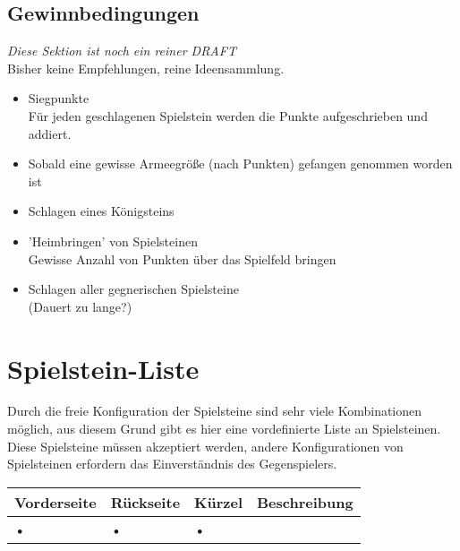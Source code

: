 \documentclass{article}
\begin{document}
\subsection{Gewinnbedingungen}

	\textit{Diese Sektion ist noch ein reiner DRAFT} \\
	Bisher keine Empfehlungen, reine Ideensammlung.
	
	\begin{itemize}
	\item Siegpunkte \\
		  Für jeden geschlagenen Spielstein werden die Punkte aufgeschrieben und addiert.

	
	\item Sobald eine gewisse Armeegröße (nach Punkten) gefangen genommen worden ist
	
	\item Schlagen eines Königsteins
	
	\item 'Heimbringen' von Spielsteinen \\
	       Gewisse Anzahl von Punkten über das Spielfeld bringen
	
	\item Schlagen aller gegnerischen Spielsteine \\
	      (Dauert zu lange?)	
	\end{itemize}


\section{Spielstein-Liste}
	
	Durch die freie Konfiguration der Spielsteine sind sehr viele Kombinationen möglich, 
	aus diesem Grund gibt es hier eine vordefinierte Liste an Spielsteinen. Diese Spielsteine
	müssen akzeptiert werden, andere Konfigurationen von Spielsteinen erfordern das Einverständnis
	des Gegenspielers.
	
	\begin{tabular}{llll}
	\hline
	Vorderseite & Rückseite & Kürzel & Beschreibung \\ \hline
	• & • & • \\ 
	\hline
	\end{tabular} 
\end{document}
